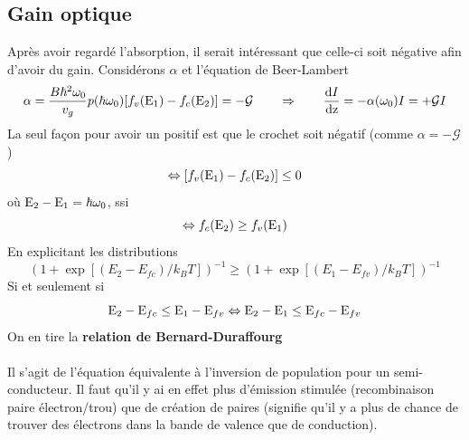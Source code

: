 	\newpage
	\subsection{Gain optique}
	Après avoir regardé l'absorption, il serait intéressant que celle-ci soit négative afin d'avoir
	du gain. Considérons $\alpha$ et l'équation de Beer-Lambert
	\begin{equation}
	\alpha  = \frac{{B{\hbar ^2}{\omega _0}}}{{{v_g}}}p(\hbar {\omega _0})[{f_v}({{\rm{E}}_1}) - {f_c}({{\rm{E}}_2})] =  - {\cal G}\qquad\Rightarrow\qquad
	\frac{{{\rm{d}}I}}{{{\rm{dz}}}} =  - \alpha ({\omega _0})I =  + {{\cal G}}I
	\end{equation}
	La seul façon pour avoir un positif est que le crochet soit négatif (comme $\alpha=-\mathcal{G}$)
	\begin{equation}
	\Leftrightarrow [{f_v}({{\rm{E}}_1}) - {f_c}({{\rm{E}}_2})] \le 0
	\end{equation}
	où ${{\rm{E}}_2} - {{\rm{E}}_1} = \hbar {\omega _0}$, ssi
	\begin{equation}
	\Leftrightarrow {f_c}({{\rm{E}}_2}) \ge {f_v}({{\rm{E}}_1})
	\end{equation}
	En explicitant les distributions
	\begin{equation}
	(1+\exp\left[(E_2-E_{fc})/k_BT\right])^{-1} \geq (1+\exp\left[(E_1-E_{fv})/k_BT\right])^{-1}
	\end{equation}
	Si et seulement si
	\begin{equation}
	{{\rm{E}}_2} - {{\rm{E}}_{fc}} \le {{\rm{E}}_1} - {{\rm{E}}_{fv}} \Leftrightarrow {{\rm{E}}_2} -
	 {{\rm{E}}_1} \le {{\rm{E}}_{fc}} - {{\rm{E}}_{fv}}
	\end{equation}
	On en tire la \textbf{relation de Bernard-Duraffourg}\\
	
	\ \\
	
	Il s'agit de l'équation équivalente à l'inversion de population pour un semi-conducteur. Il 
	faut qu'il y ai en effet plus d'émission stimulée (recombinaison paire électron/trou) que de 
	création de paires (signifie qu'il y a plus de chance de trouver des électrons dans la bande 
	de valence que de conduction).
	
